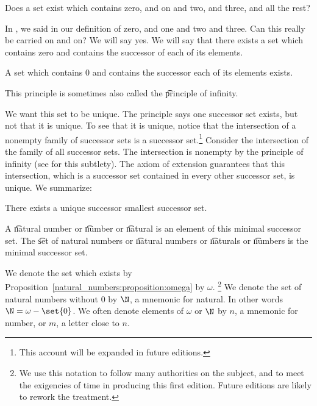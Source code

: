 
Does a set exist which contains zero, and on and two, and three, and all the rest?


In ,
we said  in our definition of zero, and one and two and three.
Can this really be carried on and on?
We will say yes.
We will say that there exists a set which contains zero and contains the successor of each of its elements.

\begin{principle}
  A set which contains 0 and contains the successor each of its elements exists.
\end{principle}

This principle is sometimes also called the \t{principle of infinity}.

We want this set to be unique.
The principle says one successor set exists, but not that it is unique.
To see that it is unique, notice that the intersection of a nonempty family of successor sets is a successor set.\footnote{This account will be expanded in future editions.}
Consider the intersection of the family of all successor sets.
The intersection is nonempty by the principle of infinity (see  for this subtlety).
The axiom of extension guarantees that this intersection, which is a successor set contained in every other successor set, is unique.
We summarize:

\begin{proposition}
  There exists a unique successor smallest successor set.
  \label{natural_numbers:proposition:omega}
\end{proposition}

A \t{natural number} or \t{number} or \t{natural} is an element of this minimal successor set.
The \t{set of natural numbers} or \t{natural numbers} or \t{naturals} or \t{numbers} is the minimal successor set.


We denote the set which exists by Proposition~\ref{natural_numbers:proposition:omega} by $\omega$.
\footnote{We use this notation to follow many authorities on the subject, and to meet the exigencies of time in producing this first edition. Future editions are likely to rework the treatment.}
We denote the set of natural numbers without 0 by $\N$, a mnemonic for natural.
In other words $\N = \omega - \set{0}$.
We often denote elements of $\omega$ or $\N$ by $n$, a mnemonic for number, or $m$, a letter close to $n$.

